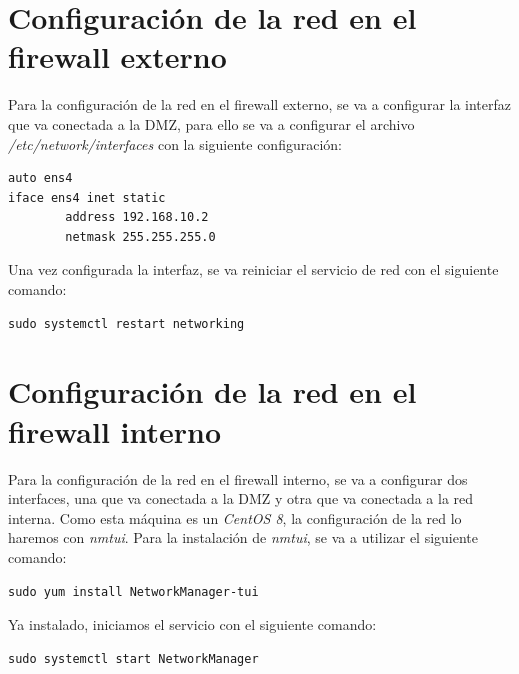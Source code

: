 \documentclass[11pt]{report}
\begin{document}
\section{Configuración de la red en el firewall externo}
Para la configuración de la red en el firewall externo, se va a configurar la interfaz que
va conectada a la DMZ, para ello se va a configurar el archivo \emph{/etc/network/interfaces}
con la siguiente configuración:
\begin{verbatim}
auto ens4
iface ens4 inet static
        address 192.168.10.2
        netmask 255.255.255.0
\end{verbatim}

Una vez configurada la interfaz, se va reiniciar el servicio de red con el siguiente comando: \\
\begin{BVerbatim}
sudo systemctl restart networking
\end{BVerbatim}

\cleardoublepage

\section{Configuración de la red en el firewall interno}
Para la configuración de la red en el firewall interno, se va a configurar dos interfaces, una
que va conectada a la DMZ y otra que va conectada a la red interna. Como esta máquina es un \emph{CentOS 8},
la configuración de la red lo haremos con \emph{nmtui}. Para la instalación de \emph{nmtui}, se va a utilizar
el siguiente comando:
\begin{BVerbatim}
sudo yum install NetworkManager-tui
\end{BVerbatim}

Ya instalado, iniciamos el servicio con el siguiente comando:
\begin{BVerbatim}
sudo systemctl start NetworkManager
\end{BVerbatim}
\end{document}
